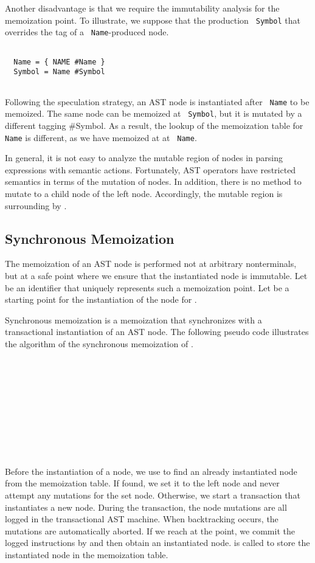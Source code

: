 \documentclass[JIP]{ipsj}
\newcommand{\nt}[1]{{\tt {\color{darkblue} #1}}}
\begin{document}
Another disadvantage is that we require the immutability analysis for the memoization point. To illustrate, we suppose that the production \nt{Symbol} that overrides the tag of a \nt{Name}-produced node.

{\small \begin{verbatim}

  Name = { NAME #Name }
  Symbol = Name #Symbol
  
\end{verbatim}}

Following the speculation strategy, an AST node is instantiated after \nt{Name} to be memoized. The same node can be memoized at \nt{Symbol}, but it is mutated by a different tagging \#Symbol. As a result, the lookup of the memoization table for \nt{Name} is different, as we have memoized at at \nt{Name}. 

In general, it is not easy to analyze the mutable region of nodes in parsing expressions with semantic actions. Fortunately, AST operators have restricted semantics in terms of the mutation of nodes. In addition, there is no method to mutate to a child node of the left node. Accordingly, the mutable region is surrounding by .

\subsection{Synchronous Memoization}

The memoization of an AST node is performed not at arbitrary nonterminals, but at a safe point where we ensure that the instantiated node is immutable. Let  be an identifier that uniquely represents such a memoization point. Let  be a starting point for the instantiation of the node for . 

Synchronous memoization is a memoization that synchronizes with a transactional instantiation of an AST node. The following pseudo code illustrates the algorithm of the synchronous memoization of . 

  \\
   \\
  \\
  \\
  \\
  \\
  \\
   \\
  \\
  
Before the instantiation of a node, we use  to find an already instantiated node from the memoization table. If found, we set it to the left node and never attempt any mutations for the set node. Otherwise, we start a transaction that instantiates a new node. During the transaction, the node mutations are all logged in the transactional AST machine. When backtracking occurs, the mutations are automatically aborted. If we reach at the  point, we commit the logged instructions by  and then obtain an instantiated node.  is called to store the instantiated node in the memoization table. 
\end{document}
